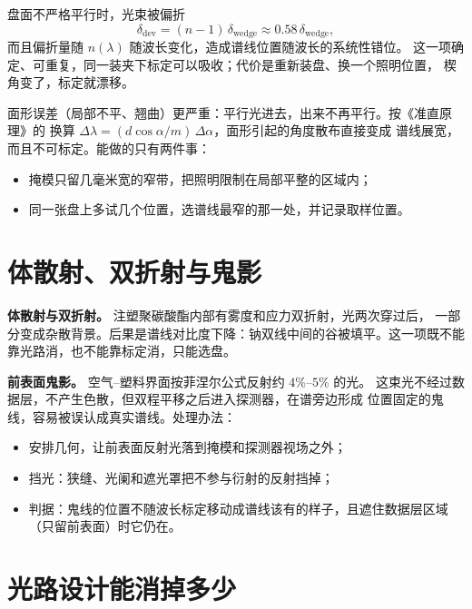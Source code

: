 \documentclass[a4paper,11pt]{ctexart}
\begin{document}
盘面不严格平行时，光束被偏折
\begin{equation}
\delta_{\mathrm{dev}} = (n-1)\,\delta_{\mathrm{wedge}} \approx 0.58\,\delta_{\mathrm{wedge}},
\end{equation}
而且偏折量随 $n(\lambda)$ 随波长变化，造成谱线位置随波长的系统性错位。
这一项确定、可重复，同一装夹下标定可以吸收；代价是重新装盘、换一个照明位置，
楔角变了，标定就漂移。

面形误差（局部不平、翘曲）更严重：平行光进去，出来不再平行。按《准直原理》的
换算 $\Delta\lambda=(d\cos\alpha/m)\,\Delta\alpha$，面形引起的角度散布直接变成
谱线展宽，而且不可标定。能做的只有两件事：
\begin{itemize}
\item 掩模只留几毫米宽的窄带，把照明限制在局部平整的区域内；
\item 同一张盘上多试几个位置，选谱线最窄的那一处，并记录取样位置。
\end{itemize}

\section{体散射、双折射与鬼影}
\label{sec:scatter}

\textbf{体散射与双折射。} 注塑聚碳酸酯内部有雾度和应力双折射，光两次穿过后，
一部分变成杂散背景。后果是谱线对比度下降：钠双线中间的谷被填平。这一项既不能
靠光路消，也不能靠标定消，只能选盘。

\textbf{前表面鬼影。} 空气--塑料界面按菲涅尔公式反射约 $4\%$--$5\%$ 的光。
这束光不经过数据层，不产生色散，但双程平移之后进入探测器，在谱旁边形成
位置固定的鬼线，容易被误认成真实谱线。处理办法：
\begin{itemize}
\item 安排几何，让前表面反射光落到掩模和探测器视场之外；
\item 挡光：狭缝、光阑和遮光罩把不参与衍射的反射挡掉；
\item 判据：鬼线的位置不随波长标定移动成谱线该有的样子，且遮住数据层区域
（只留前表面）时它仍在。
\end{itemize}

\section{光路设计能消掉多少}
\label{sec:mitigation}
\end{document}
